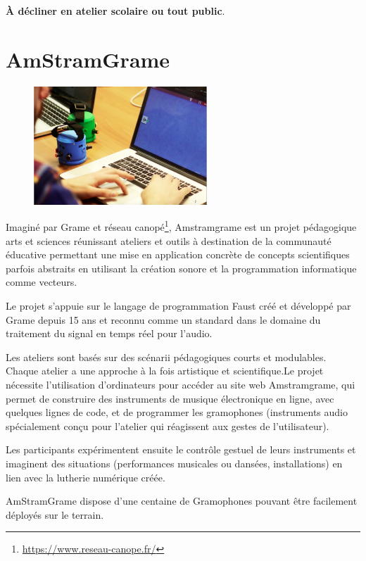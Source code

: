 \documentclass[fontsize=12pt]{scrartcl} %
\numberwithin{equation}{section} %
\numberwithin{table}{section} %
\begin{document}
\noindent
\textbf{À décliner en atelier scolaire ou tout public}.

\pagebreak

\section{AmStramGrame}
\label{app:amstram}

\begin{figure}
\centering
\includegraphics[width=6.5cm]{img/amstram}
\label{fig:amstram}
\end{figure}

Imaginé par Grame et réseau canopé\footnote{\url{https://www.reseau-canope.fr/}}, Amstramgrame est un projet pédagogique arts et sciences réunissant ateliers et outils à destination de la communauté éducative permettant une mise en application concrète de concepts scientifiques parfois abstraits en utilisant la création sonore et la programmation informatique comme vecteurs.

Le projet s'appuie sur le langage de programmation Faust créé et développé par Grame depuis 15 ans et reconnu comme un standard dans le domaine du traitement du signal en temps réel pour l'audio. 

Les ateliers sont basés sur des scénarii pédagogiques courts et modulables. Chaque atelier a une approche à la fois artistique et scientifique.Le projet nécessite l'utilisation d'ordinateurs pour accéder au site web Amstramgrame, qui permet de construire des instruments de musique électronique en ligne, avec quelques lignes de code, et de programmer les gramophones (instruments audio spécialement conçu pour l'atelier qui réagissent aux gestes de l'utilisateur).
 
Les participants expérimentent ensuite le contrôle gestuel de leurs instruments et imaginent des situations (performances musicales ou dansées, installations) en lien avec la lutherie numérique créée.

AmStramGrame dispose d'une centaine de Gramophones pouvant être facilement déployés sur le terrain.
\end{document}
